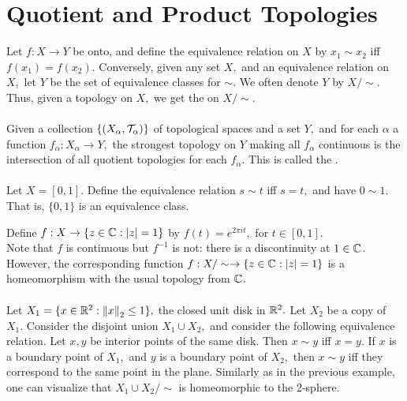 \section{Quotient and Product Topologies}
Let $f:X\rightarrow Y$ be onto, and define the equivalence relation on $X$ by $x_1\sim x_2$ iff $f(x_1)=f(x_2).$ Conversely, given any set $X,$ and an equivalence relation on $X,$ let $Y$ be the set of equivalence classes for $\sim.$ We often denote $Y$ by $X/\sim.$ Thus, given a topology on $X,$ we get the  on $X/\sim.$ \\ \\
Given a collection $\{(X_{\alpha},\mathcal{T}_{\alpha})\}$ of topological spaces and a set $Y,$ and for each $\alpha$ a function $f_{\alpha}:X_{\alpha}\rightarrow Y,$ the strongest topology on $Y$ making all $f_{\alpha}$ continuous is the intersection of all quotient topologies for each $f_{\alpha}.$ This is called the . \\ \\
\Ex Let $X=[0,1].$ Define the equivalence relation $s\sim t$ iff $s=t,$ and have $0\sim 1.$ That is, $\{0,1\}$ is an equivalence class.
\begin{center}
\end{center}

\noindent Define $f:X\rightarrow\{z\in\mathbb{C}^{}:|z|=1\}$ by $f(t)=e^{2\pi it},$ for $t\in[0,1].$ \\ Note that $f$ is continuous but $f^{-1}$ is not: there is a discontinuity at $1\in\mathbb{C}^{}$. However, the corresponding function $f:X/\sim\rightarrow\{z\in\mathbb{C}^{}:|z|=1\}$ is a homeomorphism with the usual topology from $\mathbb{C}^{}.$ \\ \\

\Ex Let $X_1=\{x\in\mathbb{R}^{2}:\left\lVert x\right\rVert_2\leq 1\},$ the closed unit disk in $\mathbb{R}^{2}.$ Let $X_2$ be a copy of $X_1.$ Consider the disjoint union $X_1\cup X_2,$ and consider the following equivalence relation. Let $x,y$ be interior points of the same disk. Then $x\sim y$ iff $x=y.$ If $x$ is a boundary point of $X_1,$ and $y$ is a boundary point of $X_2,$ then $x\sim y$ iff they correspond to the same point in the plane. Similarly as in the previous example, one can visualize that $X_1\cup X_2/\sim$ is homeomorphic to the 2-sphere.

